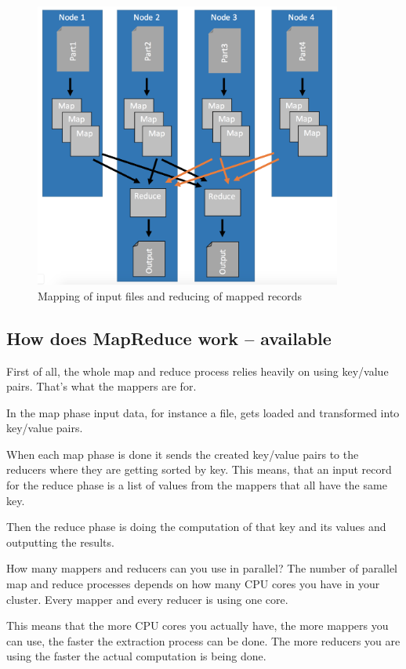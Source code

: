 \documentclass[12pt, numbers=noenddot]{scrreprt} %
\begin{document}
\begin{figure}[htbp]
  \centering
     \includegraphics[width=0.9\textwidth]{images/MapReduce-Process-Detailed}
  \caption{Mapping of input files and reducing of mapped records}
  \label{fig:Bild1}
\end{figure}

\subsection{How does MapReduce work -- available}

First of all, the whole map and reduce process relies heavily on using key/value pairs. That’s what the mappers are for.

In the map phase input data, for instance a file, gets loaded and transformed into key/value pairs.

When each map phase is done it sends the created key/value pairs to the reducers where they are getting sorted by key. This means, that an input record for the reduce phase is a list of values from the mappers that all have the same key.

Then the reduce phase is doing the computation of that key and its values and outputting the results.

How many mappers and reducers can you use in parallel? The number of parallel map and reduce processes depends on how many CPU cores you have in your cluster. Every mapper and every reducer is using one core.

This means that the more CPU cores you actually have, the more mappers you can use, the faster the extraction process can be done. The more reducers you are using the faster the actual computation is being done.
\end{document}
